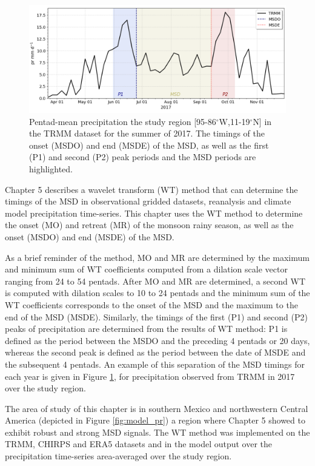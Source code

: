  \begin{figure}[t!]
\includegraphics[width=\linewidth]{figures/explain_fig_msd.png}
\caption{Pentad-mean precipitation the study region [95-86$^\circ$W,11-19$^\circ$N] in the TRMM dataset for the summer of 2017. The timings of the onset (MSDO) and end (MSDE) of the MSD, as well as the first (P1) and second (P2) peak periods and the MSD periods are highlighted. }
\label{fig:explain_msd}
\end{figure}

Chapter 5 describes a wavelet transform (WT) method that can determine the timings of the MSD in observational gridded datasets, reanalysis and climate model precipitation time-series. 
This chapter uses the WT method to determine the onset (MO) and retreat (MR) of the monsoon rainy season, as well as the onset  (MSDO) and end (MSDE) of the MSD. 

As a brief reminder of the method, MO and MR are determined by the maximum and minimum sum of WT coefficients computed from a dilation scale vector ranging from 24 to 54 pentads. After MO and MR are determined, a second WT is computed with dilation scales to 10 to 24 pentads and the minimum sum of the WT coefficients corresponds to the onset of the MSD and the maximum to the end of the MSD (MSDE). 
Similarly, the timings of the first (P1) and second (P2) peaks of precipitation are determined from the results of WT method: P1 is defined as the period between the MSDO and the preceding 4 pentads or 20 days, whereas the second peak is defined as the period between the date of MSDE and the subsequent 4 pentads. An example of this separation of the MSD timings for each year is given in Figure \ref{fig:explain_msd}, for precipitation observed from TRMM in 2017 over the study region.

The area of study of this chapter is in southern Mexico and northwestern Central America (depicted in Figure \ref{fig:model_pr}) a region where Chapter 5 showed to exhibit robust and strong MSD signals. The WT method was implemented on the TRMM, CHIRPS and ERA5 datasets and in the model output over the precipitation time-series area-averaged over the study region. 


